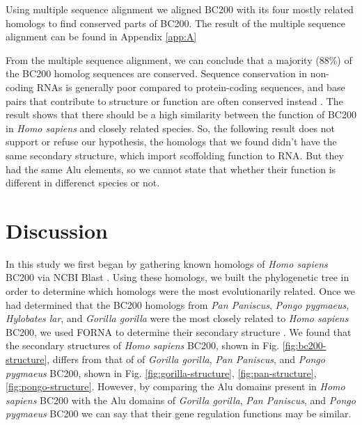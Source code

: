 \documentclass[conference, 11pt]{IEEEtran}
\begin{document}
Using multiple sequence alignment we aligned BC200 with its four mostly related homologs to find conserved parts of BC200. 
The result of the multiple sequence alignment can be found in Appendix \ref{app:A}

From the multiple sequence alignment, we can conclude that a majority (88\%) of the BC200 homolog sequences are conserved. 
Sequence conservation in non-coding RNAs is generally poor compared to protein-coding sequences, and base pairs that contribute to structure or function are often conserved instead \cite{johnsson2014evolutionary}. 
The result shows that there should be a high similarity between the function of BC200 in \emph{Homo sapiens} and closely related species. 
So, the following result does not support or refuse our hypothesis, the homologs that we found didn't have the same secondary structure, which import scoffolding function to RNA. But they had the same Alu elements, so we cannot state that whether their function is different in differenct species or not. 

\section{Discussion}\label{sec:discussion}

In this study we first began by gathering known homologs of \emph{Homo sapiens} BC200 via NCBI Blast \cite{blastTool,madden2012blast}. 
Using these homologs, we built the phylogenetic tree in order to determine which homologs were the most evolutionarily related. 
Once we had determined that the BC200 homologs from \emph{Pan Paniscus}, \emph{Pongo pygmaeus}, \emph{Hylobates lar}, and \emph{Gorilla gorilla} were the most closely related to \emph{Homo sapiens} BC200, we used FORNA to determine their secondary structure \cite{lorenz2011viennarna}. 
We found that the secondary structures of \emph{Homo sapiens} BC200, shown in Fig. \ref{fig:bc200-structure}, differs from that of of \emph{Gorilla gorilla}, \emph{Pan Paniscus}, and \emph{Pongo pygmaeus} BC200, shown in Fig. \ref{fig:gorilla-structure}, \ref{fig:pan-structure}, \ref{fig:pongo-structure}.
However, by comparing the Alu domains present in \emph{Homo sapiens} BC200 with the Alu domains of \emph{Gorilla gorilla}, \emph{Pan Paniscus}, and \emph{Pongo pygmaeus} BC200 we can say that their gene regulation functions may be similar. 
\end{document}
